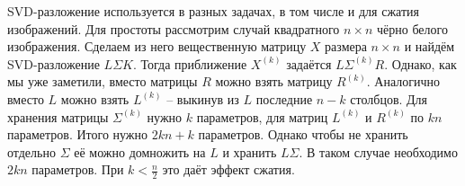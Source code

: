 SVD-разложение используется в разных задачах, в том числе и для сжатия изображений.  Для простоты рассмотрим случай квадратного $n \times n$ чёрно белого изображения. Сделаем из него вещественную матрицу $X$ размера $n \times n$ и найдём SVD-разложение $L \Sigma K$. Тогда приближение $X^{(k)}$ задаётся $L\Sigma^{(k)}R$. Однако, как мы уже заметили, вместо матрицы $R$ можно взять матрицу $R^{(k)}$. Аналогично вместо $L$ можно взять $L^{(k)}$ -- выкинув из $L$ последние $n-k$ столбцов. Для хранения матрицы $\Sigma^{(k)}$ нужно $k$ параметров, для матриц $L^{(k)}$ и $R^{(k)}$ по $kn$ параметров. Итого нужно $2kn+k$ параметров. Однако чтобы не хранить отдельно $\Sigma$ её можно домножить на $L$ и хранить $L\Sigma$. В таком случае необходимо $2kn$ параметров. При $k<\frac{n}{2}$ это даёт эффект сжатия. 